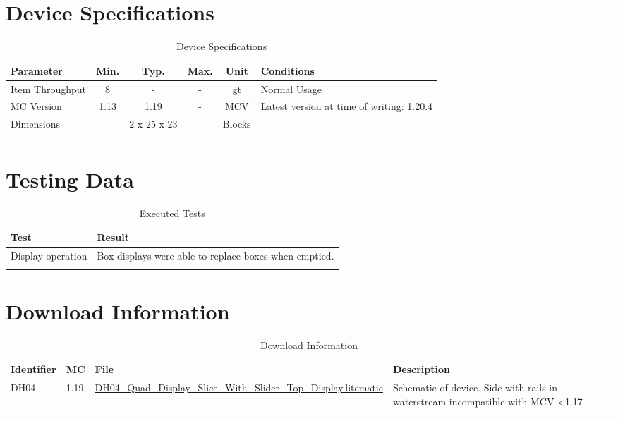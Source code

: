 \documentclass[10pt]{datasheet}
\begin{document}
\onecolumn

\section{Device Specifications}

\begin{table}[h]
    \caption{Device Specifications}
    \begin{tabularx}{\textwidth}{l | c c c | c | X}
        \thickhline
        \textbf{Parameter} & \textbf{Min.} & \textbf{Typ.} & \textbf{Max.} &
        \textbf{Unit} & \textbf{Conditions} \\
        \hline
        Item Throughput  & 8 & - & - & gt & Normal Usage \\
        \hline
        MC Version & 1.13 & 1.19 & - & MCV & Latest version at time of writing: 1.20.4\\
        \hline
        Dimensions & & 2 x 25 x 23 & & Blocks & \\
        \thickhline
\end{tabularx}
\end{table}
\newpage
\section{Testing Data}
\begin{table}[h]
\caption{Executed Tests}
\begin{tabularx}{\textwidth}{l | X}
    \thickhline
    \textbf{Test} & \textbf{Result} \\
    \hline
    Display operation & Box displays were able to replace boxes when emptied. \\
    \thickhline
\end{tabularx}
\end{table}

\section{Download Information}
\begin{table}[h]
    \caption{Download Information}
    \begin{tabularx}{\textwidth}{l | l | l | X}
        \thickhline
        \textbf{Identifier} & \textbf{MC} & \textbf{File} & \textbf{Description} \\
        \hline
        DH04 & 1.19 & \href{https://github.com/Soontech-Annals/Archive/blob/63c9ea8c34519ca4eb58649773e0c37e7e462fdd/Archive/display-halls/DH04\%20Quad\%20Display\%20Slice\%20With\%20Slider\%20Top\%20Display/DH04\_Quad\_Display\_Slice\_With\_Slider\_Top\_Display.litematic?raw=1}{DH04\_Quad\_Display\_Slice\_With\_Slider\_Top\_Display.litematic} & Schematic of device. Side with rails in waterstream incompatible with MCV \textless 1.17\\
        \hline
        \thickhline
    \end{tabularx}
\end{table}
\end{document}
